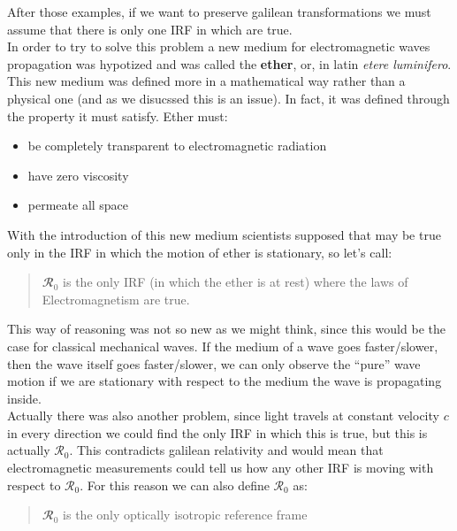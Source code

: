 After those examples, if we want to preserve galilean transformations we must assume that there is only one IRF in which \maxwellref\;are true.\\
In order to try to solve this problem a new medium for electromagnetic waves propagation was hypotized and was called the \textbf{ether}, or, in latin \textit{etere luminifero}.\\
This new medium was defined more in a mathematical way rather than a physical one (and as we disucssed this is an issue). In fact, it was defined through the property it must satisfy.
Ether must:
\begin{itemize}
  \item be completely transparent to electromagnetic radiation
  \item have zero viscosity
  \item permeate all space
\end{itemize}
With the introduction of this new medium scientists supposed that \maxwellref\;may be true only in the IRF in which the motion of ether is stationary, so let's call:
\begin{quote}
  $\mathbfcal{R}_0$ is the only IRF (in which the ether is at rest) where the laws of Electromagnetism are true.
\end{quote}
This way of reasoning was not so new as we might think, since this would be the case for classical mechanical waves. If the medium of a wave goes faster/slower, then the wave itself goes faster/slower, we can only observe the ``pure'' wave motion if we are stationary with respect to the medium the wave is propagating inside.\\
Actually there was also another problem, since light travels at constant velocity $c$ in every direction we could find the only IRF in which this is true, but this is actually $\mathcal{R}_0$. This contradicts galilean relativity and would mean that electromagnetic measurements could tell us how any other IRF is moving with respect to $\mathcal{R}_0$. For this reason we can also define $\mathcal{R}_0$ as:
\begin{quote}
  $\mathbfcal{R}_0$ is the only optically isotropic reference frame
\end{quote}
